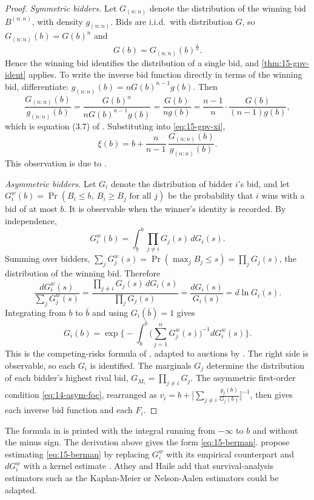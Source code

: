 \begin{proof}
\emph{Symmetric bidders.} Let $G_{(n:n)}$ denote the distribution of the winning bid $B^{(n:n)}$, with density $g_{(n:n)}$. Bids are i.i.d.\ with distribution $G$, so $G_{(n:n)}(b)=G(b)^n$ and
\begin{equation}\label{eq:15-winbid-G}
G(b)=G_{(n:n)}(b)^{\frac1n}.
\end{equation}
Hence the winning bid identifies the distribution of a single bid, and \cref{thm:15-gpv-ident} applies. To write the inverse bid function directly in terms of the winning bid, differentiate: $g_{(n:n)}(b)=nG(b)^{n-1}g(b)$. Then
\[
\frac{G_{(n:n)}(b)}{g_{(n:n)}(b)}=\frac{G(b)^n}{nG(b)^{n-1}g(b)}=\frac{G(b)}{ng(b)}=\frac{n-1}{n}\cdot\frac{G(b)}{(n-1)g(b)},
\]
which is equation (3.7) of \citet{AtheyHaile2007}. Substituting into \eqref{eq:15-gpv-xi},
\begin{equation}\label{eq:15-winbid-xi}
\xi(b)=b+\frac{n}{n-1}\,\frac{G_{(n:n)}(b)}{g_{(n:n)}(b)}.
\end{equation}
This observation is due to \citet{GuerrePerrigneVuong1995}.

\emph{Asymmetric bidders.} Let $G_i$ denote the distribution of bidder $i$'s bid, and let $G^w_i(b)=\Pr(B_i\le b,\ B_i\ge B_j\text{ for all }j)$ be the probability that $i$ wins with a bid of at most $b$. It is observable when the winner's identity is recorded. By independence,
\[
G^w_i(b)=\int_{\underline b}^b\prod_{j\neq i}G_j(s)\,dG_i(s).
\]
Summing over bidders, $\sum_jG^w_j(s)=\Pr(\max_jB_j\le s)=\prod_jG_j(s)$, the distribution of the winning bid. Therefore
\[
\frac{dG^w_i(s)}{\sum_jG^w_j(s)}=\frac{\prod_{j\neq i}G_j(s)\,dG_i(s)}{\prod_jG_j(s)}=\frac{dG_i(s)}{G_i(s)}=d\ln G_i(s).
\]
Integrating from $b$ to $\bar b$ and using $G_i(\bar b)=1$ gives
\begin{equation}\label{eq:15-berman}
G_i(b)=\exp\Big\{-\int_b^{\bar b}\Big(\sum_{j=1}^nG^w_j(s)\Big)^{-1}dG^w_i(s)\Big\}.
\end{equation}
This is the competing-risks formula of \citet{Berman1963}, adapted to auctions by \citet{AtheyHaile2002}. The right side is observable, so each $G_i$ is identified. The marginals $G_j$ determine the distribution of each bidder's highest rival bid, $G_{M_i}=\prod_{j\neq i}G_j$. The asymmetric first-order condition \eqref{eq:14-asym-foc}, rearranged as $v_i=b+\big[\sum_{j\neq i}\frac{g_j(b)}{G_j(b)}\big]^{-1}$, then gives each inverse bid function and each $F_i$.
\end{proof}

The formula in \citet[eq.~(3.8)]{AtheyHaile2007} is printed with the integral running from $-\infty$ to $b$ and without the minus sign. The derivation above gives the form \eqref{eq:15-berman}.  propose estimating \eqref{eq:15-berman} by replacing $G^w_i$ with its empirical counterpart and $dG^w_i$ with a kernel estimate \citep[Section 3.3.1]{AtheyHaile2007}. Athey and Haile add that survival-analysis estimators such as the Kaplan-Meier or Nelson-Aalen estimators could be adapted.

